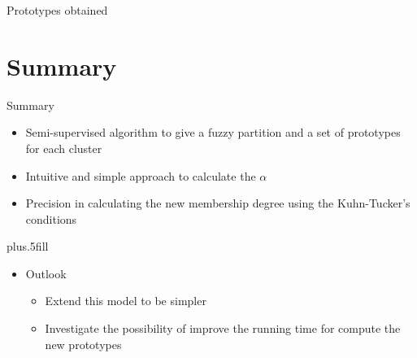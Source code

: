\documentclass{beamer}
\begin{document}
\begin{frame}{Prototypes obtained}
	\begin{figure}
		\centering
	\end{figure}
\end{frame}

%
%

\section*{Summary}

\begin{frame}{Summary}
  \begin{itemize}
		\item{Semi-supervised algorithm to give a fuzzy partition and a set of prototypes for each cluster}
		\item{Intuitive and simple approach to calculate the $\alpha$}
		\item{Precision in calculating the new membership degree using the Kuhn-Tucker's conditions}
  \end{itemize}
  \vskip0pt plus.5fill
  \begin{itemize}
  \item{Outlook}
    \begin{itemize}
			\item{Extend this model to be simpler}
			\item{Investigate the possibility of improve the running time for compute the new prototypes}
    \end{itemize}
  \end{itemize}
\end{frame}
\end{document}
